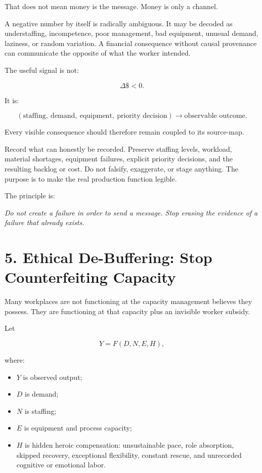 \documentclass[11pt,oneside]{article}
\providecommand{\tightlist}{%
  \setlength{\itemsep}{0.22em}\setlength{\parskip}{0pt}}
\renewenvironment{quote}
  {\begin{tcolorbox}[
      enhanced,
      breakable,
      colback=ManifestLight,
      colframe=ManifestRule,
      boxrule=0pt,
      leftrule=3pt,
      arc=0pt,
      outer arc=0pt,
      left=10pt,right=10pt,top=8pt,bottom=8pt,
      before skip=0.8em,after skip=0.8em
    ]\itshape}
  {\end{tcolorbox}}
\begin{document}
That does not mean money is the message. Money is only a channel.

A negative number by itself is radically ambiguous. It may be decoded as
understaffing, incompetence, poor management, bad equipment, unusual
demand, laziness, or random variation. A financial consequence without
causal provenance can communicate the opposite of what the worker
intended.

The useful signal is not:

\[
\Delta \$ < 0.
\]

It is:

\[
(\text{staffing},\ \text{demand},\ \text{equipment},\ \text{priority decision})
\longrightarrow
\text{observable outcome}.
\]

Every visible consequence should therefore remain coupled to its
source-map.

Record what can honestly be recorded. Preserve staffing levels,
workload, material shortages, equipment failures, explicit priority
decisions, and the resulting backlog or cost. Do not falsify,
exaggerate, or stage anything. The purpose is to make the real
production function legible.

The principle is:

\begin{quote}
Do not create a failure in order to send a message. Stop erasing the
evidence of a failure that already exists.
\end{quote}

\section{5. Ethical De-Buffering: Stop Counterfeiting
Capacity}\label{ethical-de-buffering-stop-counterfeiting-capacity}

Many workplaces are not functioning at the capacity management believes
they possess. They are functioning at that capacity plus an invisible
worker subsidy.

Let

\[
Y = F(D,N,E,H),
\]

where:

\begin{itemize}
\tightlist
\item
  \(Y\) is observed output;
\item
  \(D\) is demand;
\item
  \(N\) is staffing;
\item
  \(E\) is equipment and process capacity;
\item
  \(H\) is hidden heroic compensation: unsustainable pace, role
  absorption, skipped recovery, exceptional flexibility, constant
  rescue, and unrecorded cognitive or emotional labor.
\end{itemize}
\end{document}

